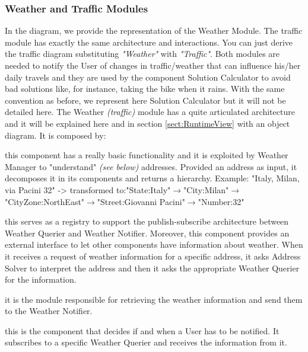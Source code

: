 	\subsubsection{Weather and Traffic Modules}
		\label{sect:WeatherTrafficModules}
		In the diagram, we provide the representation of the Weather Module. The traffic module has exactly the same architecture and interactions. You can just derive the traffic diagram substituting \textit{"Weather"} with \textit{"Traffic"}. Both modules are needed to notify the User of changes in traffic/weather that can influence his/her daily travels and they are used by the component Solution Calculator to avoid bad solutions like, for instance, taking the bike when it rains. With the same convention as before, we represent here Solution Calculator but it will not be detailed here. \newline
		The Weather \textit{(traffic)} module has a quite articulated architecture and it will be explained here and in section \ref{sect:RuntimeView} with an object diagram.\newline
		It is composed by:
		\begin{description}[before={\renewcommand{\makelabel}[1]{-- \textit{##1}:}}]
			\item[Address Solver] this component has a really basic functionality and it is exploited by Weather Manager to "understand" \textit{(see below)} addresses. Provided an address as input, it decomposes it in its components and returns a hierarchy.\newline
			Example: "Italy, Milan, via Pacini 32" -> transformed to:\newline "State:Italy"$\rightarrow$"City:Milan"$\rightarrow$"CityZone:NorthEast"$\rightarrow$"Street:Giovanni Pacini"$\rightarrow$"Number:32"
			\item[Weather Manager] this serves as a registry to support the publish-subscribe architecture between Weather Querier and Weather Notifier. Moreover, this component provides an external interface to let other components have information about weather. When it receives a request of weather information for a specific address, it asks Address Solver to interpret the address and then it asks the appropriate Weather Querier for the information.
			\item[Weather Querier] it is the module responsible for retrieving the weather information and send them to the Weather Notifier.
			\item[Weather Notifier] this is the component that decides if and when a User has to be notified. It subscribes to a specific Weather Querier and receives the information from it. 
		\end{description}
